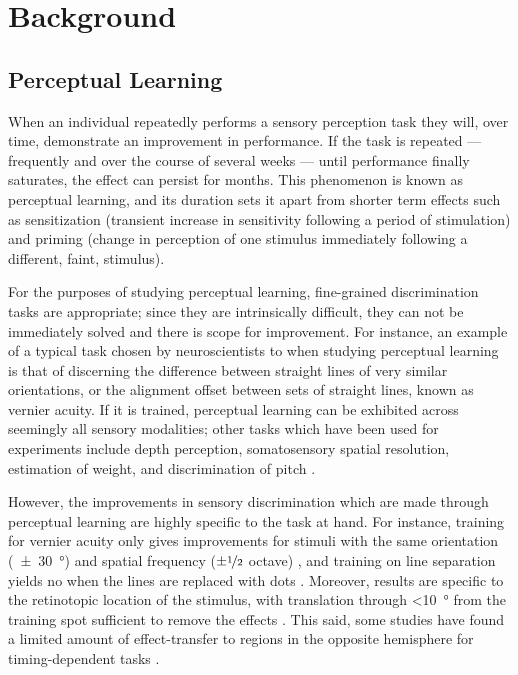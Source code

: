 \section{Background}
\label{ch:bg}

\subsection{Perceptual Learning}
\label{sec:bgpl}

When an individual repeatedly performs a sensory perception task they will, over time, demonstrate an improvement in performance.
If the task is repeated --- frequently and over the course of several weeks --- until performance finally saturates, the effect can persist for months.
This phenomenon is known as perceptual learning, and its duration sets it apart from shorter term effects such as sensitization (transient increase in sensitivity following a period of stimulation) and priming (change in perception of one stimulus immediately following a different, faint, stimulus).

For the purposes of studying perceptual learning, fine-grained discrimination tasks are appropriate; since they are intrinsically difficult, they can not be immediately solved and there is scope for improvement.
For instance, an example of a typical task chosen by neuroscientists to when studying perceptual learning is that of discerning the difference between straight lines of very similar orientations, or the alignment offset between sets of straight lines, known as vernier acuity.
If it is trained, perceptual learning can be exhibited across seemingly all sensory modalities; other tasks which have been used for experiments include depth perception, somatosensory spatial resolution, estimation of weight, and discrimination of pitch \citep{Gilbert1994,Gilbert2001}.

However, the improvements in sensory discrimination which are made through perceptual learning are highly specific to the task at hand.
For instance, training for vernier acuity only gives improvements for stimuli with the same orientation (\SI{\pm30}{\degree}) and spatial frequency ($\pm\nicefrac{1}{2}$ octave) \citep{Fiorentini1980,Poggio1991}, and training on line separation yields no when the lines are replaced with dots \citep{Poggio1992}.
Moreover, results are specific to the retinotopic location of the stimulus, with translation through \SI{<10}{\degree} from the training spot sufficient to remove the effects \citep{Fiorentini1980,Fiorentini1981,Poggio1991,Karni1991}.
This said, some studies have found a limited amount of effect-transfer to regions in the opposite hemisphere for timing-dependent tasks \citep{Ball1987,Berardi1987}.


